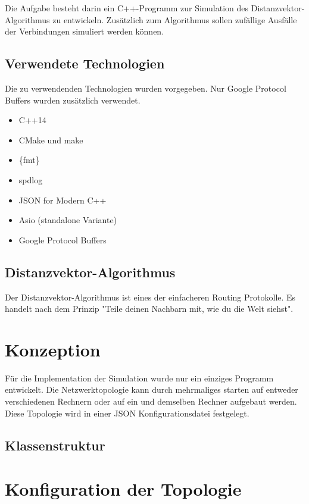 \documentclass[a4paper,ngerman]{article}
\begin{document}
Die Aufgabe besteht darin ein C++-Programm zur Simulation des Distanzvektor-Algorithmus zu entwickeln. Zusätzlich zum Algorithmus sollen zufällige Ausfälle der Verbindungen simuliert werden können.

\subsection{Verwendete Technologien}

Die zu verwendenden Technologien wurden vorgegeben. Nur Google Protocol Buffers wurden zusätzlich verwendet.

\begin{itemize}
    \item C++14
    \item CMake und make
    \item \{fmt\}
    \item spdlog
    \item JSON for Modern C++
    \item Asio (standalone Variante)
    \item Google Protocol Buffers
\end{itemize}

\subsection{Distanzvektor-Algorithmus}

Der Distanzvektor-Algorithmus ist eines der einfacheren Routing Protokolle. Es handelt nach dem Prinzip "Teile deinen Nachbarn mit, wie du die Welt siehst".

\section{Konzeption}

Für die Implementation der Simulation wurde nur ein einziges Programm entwickelt. Die Netzwerktopologie kann durch mehrmaliges starten auf entweder verschiedenen Rechnern oder auf ein und demselben Rechner aufgebaut werden. Diese Topologie wird in einer JSON Konfigurationsdatei festgelegt.

\subsection{Klassenstruktur}


\section{Konfiguration der Topologie}
\end{document}
